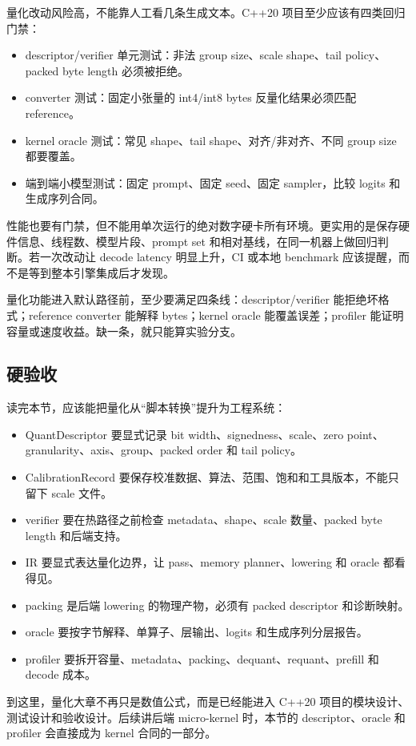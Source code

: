 量化改动风险高，不能靠人工看几条生成文本。C++20 项目至少应该有四类回归门禁：

\begin{itemize}
  \item descriptor/verifier 单元测试：非法 group size、scale shape、tail policy、packed byte length 必须被拒绝。
  \item converter 测试：固定小张量的 int4/int8 bytes 反量化结果必须匹配 reference。
  \item kernel oracle 测试：常见 shape、tail shape、对齐/非对齐、不同 group size 都要覆盖。
  \item 端到端小模型测试：固定 prompt、固定 seed、固定 sampler，比较 logits 和生成序列合同。
\end{itemize}

性能也要有门禁，但不能用单次运行的绝对数字硬卡所有环境。更实用的是保存硬件信息、线程数、模型片段、prompt set 和相对基线，在同一机器上做回归判断。若一次改动让 decode latency 明显上升，CI 或本地 benchmark 应该提醒，而不是等到整本引擎集成后才发现。

\begin{rubricbox}
量化功能进入默认路径前，至少要满足四条线：descriptor/verifier 能拒绝坏格式；reference converter 能解释 bytes；kernel oracle 能覆盖误差；profiler 能证明容量或速度收益。缺一条，就只能算实验分支。
\end{rubricbox}

\subsection{硬验收}

读完本节，应该能把量化从“脚本转换”提升为工程系统：

\begin{itemize}
  \item QuantDescriptor 要显式记录 bit width、signedness、scale、zero point、granularity、axis、group、packed order 和 tail policy。
  \item CalibrationRecord 要保存校准数据、算法、范围、饱和和工具版本，不能只留下 scale 文件。
  \item verifier 要在热路径之前检查 metadata、shape、scale 数量、packed byte length 和后端支持。
  \item IR 要显式表达量化边界，让 pass、memory planner、lowering 和 oracle 都看得见。
  \item packing 是后端 lowering 的物理产物，必须有 packed descriptor 和诊断映射。
  \item oracle 要按字节解释、单算子、层输出、logits 和生成序列分层报告。
  \item profiler 要拆开容量、metadata、packing、dequant、requant、prefill 和 decode 成本。
\end{itemize}

到这里，量化大章不再只是数值公式，而是已经能进入 C++20 项目的模块设计、测试设计和验收设计。后续讲后端 micro-kernel 时，本节的 descriptor、oracle 和 profiler 会直接成为 kernel 合同的一部分。
